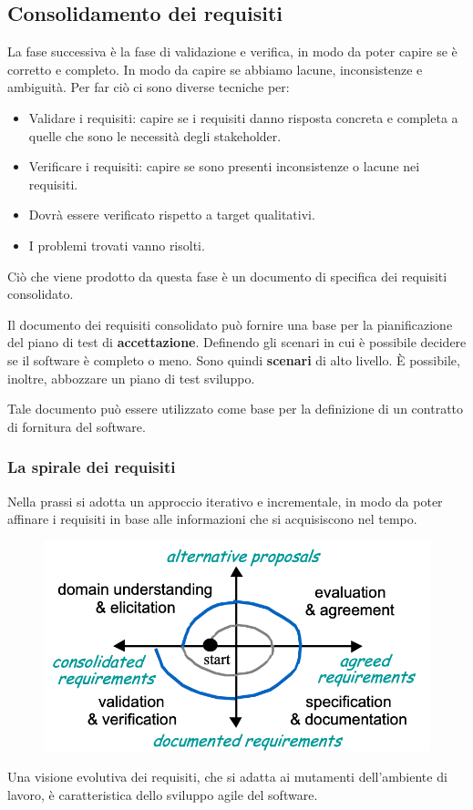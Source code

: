 \subsection{Consolidamento dei requisiti}
La fase successiva è la fase di validazione e verifica, in modo da poter
capire se è corretto e completo. In modo da capire se abbiamo lacune, inconsistenze
e ambiguità.
Per far ciò ci sono diverse tecniche per:
\begin{itemize}
    \item Validare i requisiti: capire se i requisiti danno risposta concreta e 
    completa a quelle che sono le necessità degli stakeholder.
    \item Verificare i requisiti: capire se sono presenti inconsistenze o lacune 
    nei requisiti.
    \item Dovrà essere verificato rispetto a target qualitativi.
    \item I problemi trovati vanno risolti.
\end{itemize}

\begin{tcolorbox}[colback=blue!5!white,colframe=blue!75!black]
    Ciò che viene prodotto da questa fase è un documento di specifica dei requisiti
    consolidato.
\end{tcolorbox}

Il documento dei requisiti consolidato può fornire una base per la pianificazione 
del piano di test di \textbf{accettazione}. Definendo gli scenari in cui è possibile 
decidere se il software è completo o meno. Sono quindi \textbf{scenari} di alto 
livello.
È possibile, inoltre, abbozzare un piano di test sviluppo.

Tale documento può essere utilizzato come base per la definizione di un contratto 
di fornitura del software.

\subsubsection{La spirale dei requisiti}
Nella prassi si adotta un approccio iterativo e incrementale, in modo da poter
affinare i requisiti in base alle informazioni che si acquisiscono nel tempo.
\begin{figure}[H]
    \centering
    \includegraphics[scale=0.4]{img/ciclo.png}
    \label{fig:ciclo}
\end{figure}
Una visione evolutiva dei requisiti, che si adatta ai mutamenti
dell'ambiente di lavoro,
è caratteristica dello sviluppo agile del software.
